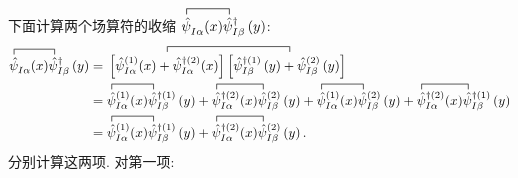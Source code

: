 下面计算两个场算符的收缩 $\contraction{}{\hat{\psi}}{^{}_{I \alpha}(x)}{\hat{\psi}}
\hat{\psi}^{}_{I \alpha}(x) \hat{\psi}_{I \beta}^{\dagger}\left(y\right)$:
\begin{align}
\contraction{}{\hat{\psi}}{^{}_{I \alpha}(x)}{\hat{\psi}}
\hat{\psi}^{}_{I \alpha}(x) \hat{\psi}_{I \beta}^{\dagger}\left(y\right) &=
\contraction{}{\left[\hat{\psi}_{I \alpha}^{(1)}(x)+\hat{\psi}_{I \alpha}^{\dagger(2)}(x)\right]}{}{\left[\hat{\psi}_{I \beta}^{\dagger(1)}\left(y\right)+\hat{\psi}_{I \beta}^{(2)}\left(y\right)\right]}
\left[\hat{\psi}_{I \alpha}^{(1)}(x)+\hat{\psi}_{I \alpha}^{\dagger(2)}(x)\right]\left[\hat{\psi}_{I \beta}^{\dagger(1)}\left(y\right)+\hat{\psi}_{I \beta}^{(2)}\left(y\right)\right] \nonumber\\
&=\contraction{}{\hat{\psi}}{_{I \alpha}^{(1)}(x)}{\hat{\psi}}
\hat{\psi}_{I \alpha}^{(1)}(x) \hat{\psi}_{I \beta}^{\dagger(1)}\left(y\right)+
\contraction{}{\hat{\psi}}{_{I \alpha}^{\dagger(2)}(x)}{\hat{\psi}}
\hat{\psi}_{I \alpha}^{\dagger(2)}(x) \hat{\psi}_{I \beta}^{(2)}\left(y\right)+
\contraction{}{\hat{\psi}}{_{I \alpha}^{(1)}(x)}{ \hat{\psi}}
\hat{\psi}_{I \alpha}^{(1)}(x) \hat{\psi}_{I \beta}^{(2)}\left(y\right)+
\contraction{}{\hat{\psi}}{_{I \alpha}^{\dagger(2)}(x)}{\hat{\psi}}
\hat{\psi}_{I \alpha}^{\dagger(2)}(x) \hat{\psi}_{I \beta}^{\dagger(1)}\left(y\right)\nonumber\\
&=\contraction{}{\hat{\psi}}{_{I \alpha}^{(1)}(x)}{\hat{\psi}}
\hat{\psi}_{I \alpha}^{(1)}(x) \hat{\psi}_{I \beta}^{\dagger(1)}\left(y\right)+
\contraction{}{\hat{\psi}}{_{I \alpha}^{\dagger(2)}(x)}{\hat{\psi}}
\hat{\psi}_{I \alpha}^{\dagger(2)}(x) \hat{\psi}_{I \beta}^{(2)}\left(y\right).
\end{align}
分别计算这两项. 对第一项:
